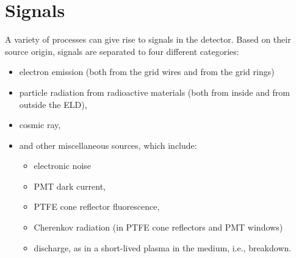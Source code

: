 \section{Signals}
\label{sec:events}
A variety of processes can give rise to signals in the detector. Based on their source origin, signals are separated to four different categories:
\begin{itemize}
	\item electron emission (both from the grid wires and from the grid rings)
	\item particle radiation from radioactive materials (both from inside and from outside the ELD),
	\item cosmic ray,
	\item and other miscellaneous sources, which include: 
	\begin{itemize}
		\item electronic noise %
		\item PMT dark current, 
		\item PTFE cone reflector fluorescence, 
		\item Cherenkov radiation (in PTFE cone reflectors and PMT windows)%
		\item discharge, as in a short-lived plasma in the medium, i.e., breakdown.
	\end{itemize}
\end{itemize}

